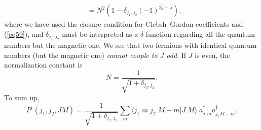 \begin{subappendices}
\begin{equation}
\begin{split}
    &=N^2\left(1-\delta_{j_1,j_2}(-1)^{2j-J}\right),
\end{split}
\end{equation}
where we have used the closure condition for Clebsh--Gordan coefficients and (\ref{eq59}), and $\delta_{j_1,j_2}$ must be interpreted as a $\delta$ function regarding all the quantum numbers but the magnetic one.
We see that two fermions with identical quantum numbers (but the magnetic one) \emph{cannot couple to $J$ odd}. If $J$ is even, the normalization constant is
\begin{equation}\label{eq58}
N=\frac{1}{\sqrt{1+\delta_{j_1,j_2}}}.
\end{equation}
To sum up,
\begin{equation}\label{eq60}
P^\dagger(j_1,j_2,J M)=\frac{1}{\sqrt{1+\delta_{j_1,j_2}}}\sum_m \langle j_1 \; m \;j_2 \;M-m|J \; M\rangle \;a^\dagger_{j_1m}a^\dagger_{j_2M-m}.
\end{equation}



\end{subappendices}
